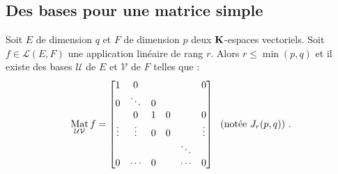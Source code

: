 \subsection{Des bases pour une matrice simple}
\begin{propn} \label{prop: equivJr}
 Soit $E$ de dimension $q$ et $F$ de dimension $p$ deux $\mathbf{K}$-espaces vectoriels. Soit $f\in\mathcal L(E,F)$ une application linéaire de rang $r$. Alors $r\leq\min(p,q)$ et il existe des bases $\mathcal U$ de $E$ et $\mathcal V$ de $F$ telles que :
\begin{displaymath}
 \mathop{\mathrm{Mat}}_{\mathcal U \mathcal V}f = 
\begin{bmatrix}
1      & 0      &   &   &        & 0 \\
0      & \ddots & 0 &   &        & \\
       & 0      & 1 & 0 &        & 0 \\
\vdots & \vdots & 0 & 0 &        & \vdots \\
       &        &   &   & \ddots & \\
0      & \cdots & 0 &   & \cdots & 0
\end{bmatrix}\;
\text{ (notée $J_r(p,q)$) }.
\end{displaymath}
\end{propn}
